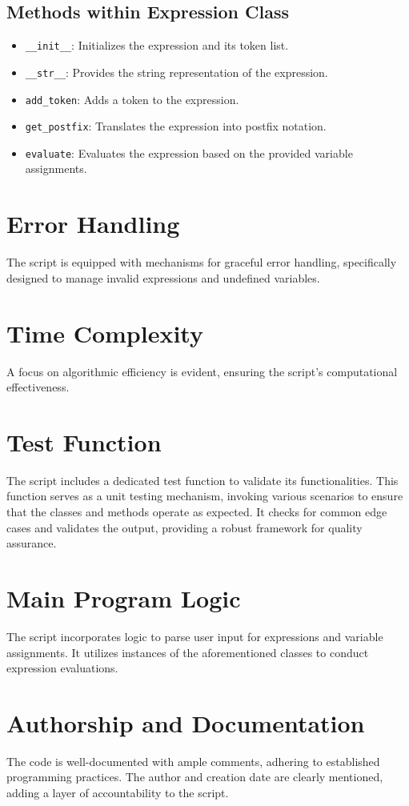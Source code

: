 \documentclass[12pt]{article}
\begin{document}
\subsection{Methods within Expression Class}
\begin{itemize}
    \item \texttt{\_\_init\_\_}: Initializes the expression and its token list.
    \item \texttt{\_\_str\_\_}: Provides the string representation of the expression.
    \item \texttt{add\_token}: Adds a token to the expression.
    \item \texttt{get\_postfix}: Translates the expression into postfix notation.
    \item \texttt{evaluate}: Evaluates the expression based on the provided variable assignments.
\end{itemize}

\section{Error Handling}
The script is equipped with mechanisms for graceful error handling, specifically designed to manage invalid expressions and undefined variables.

\section{Time Complexity}
A focus on algorithmic efficiency is evident, ensuring the script's computational effectiveness.

\section{Test Function}
The script includes a dedicated test function to validate its functionalities. 
This function serves as a unit testing mechanism, invoking various scenarios to ensure that the classes and methods operate as expected. 
It checks for common edge cases and validates the output, providing a robust framework for quality assurance.

\section{Main Program Logic}
The script incorporates logic to parse user input for expressions and variable assignments. 
It utilizes instances of the aforementioned classes to conduct expression evaluations.

\section{Authorship and Documentation}
The code is well-documented with ample comments, adhering to established programming practices. 
The author and creation date are clearly mentioned, adding a layer of accountability to the script.
\end{document}
